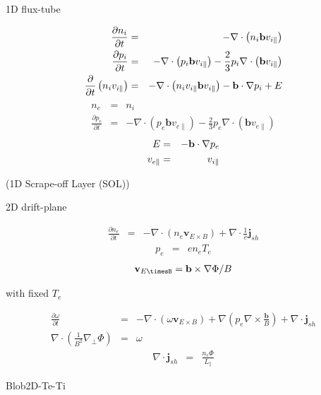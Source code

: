 1D flux-tube

\begin{eqnarray}
\frac{\partial n_i}{\partial t} &=& 
-\nabla\cdot\left(n_i\mathbf{b}v_{i\|}\right) \\ \frac{\partial p_i}{\partial 
t} &=& -\nabla\cdot\left(p_i\mathbf{b}v_{i\|}\right) - 
\frac{2}{3}p_i\nabla\cdot\left(\mathbf{b}v_{i\|}\right) \\ 
\frac{\partial}{\partial t}\left(n_iv_{i\|}\right) &=& 
-\nabla\cdot\left(n_iv_{i\|} \mathbf{b}v_{i\|}\right) - {\bf b}\cdot{\nabla}p_i + E 
\end{eqnarray}
\begin{eqnarray}
n_e &=& n_i \\ \frac{\partial p_e}{\partial t} &=& 
-\nabla\cdot\left(p_e\mathbf{b}v_{e\|}\right) - 
\frac{2}{3}p_e\nabla\cdot\left(\mathbf{b}v_{e\|}\right)
\end{eqnarray}
\begin{eqnarray}
E &=& -{\bf b}\cdot{\nabla}p_e \\ v_{e\|} &=& v_{i\|}
\end{eqnarray}

(1D Scrape-off Layer (SOL))

2D drift-plane


\begin{eqnarray}
\frac{\partial n_e}{\partial t} &=& - \nabla\cdot\left(n_e\mathbf{v}_{E\times 
B}\right) + \nabla\cdot{\frac{1}{e}\mathbf{j}_{sh}}
\end{eqnarray}
\begin{eqnarray}
p_e &=& e n_e T_e
\end{eqnarray}
\begin{eqnarray}
\mathbf{v}_{E\timesB} = {\bf b} \times \nabla \Phi / B
\end{eqnarray}

with fixed $T_e$

\begin{eqnarray}
\frac{\partial \omega}{\partial t} &=& - 
\nabla\cdot\left(\omega\mathbf{v}_{E\times B}\right) + 
\nabla\left(p_e\nabla\times\frac{\mathbf{b}}{B}\right) + 
\nabla\cdot\mathbf{j}_{sh} \\ 
\nabla\cdot\left(\frac{1}{B^2}\nabla_\perp\Phi\right) &=& \omega
\end{eqnarray}
\begin{eqnarray}
\nabla\cdot{\mathbf{j}_{sh}} &=& \frac{n_e\Phi}{L_{\|}}
\end{eqnarray}

Blob2D-Te-Ti

